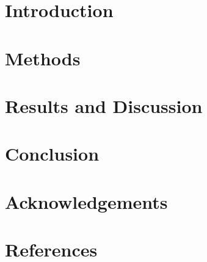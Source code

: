 \documentclass[%
    a4paper,
    conference,
    oneside,
    twocolumn]{IEEEtran}
\title{\docTitle}
\author{%
    \IEEEauthorblockN{\docAuthorN}
    \IEEEauthorblockA{\docAuthorA}}
\begin{document}
\maketitle

\begin{abstract}
\blindtext
\end{abstract}

\section{Introduction}
\blindtext[2]

\section{Methods}
\blindtext[5]

\section{Results and Discussion}
\blindtext[3]

\section{Conclusion}
\blindtext[2]

\section{Acknowledgements}
\blindtext[1]

\section{References}
\blindtext[3]
\end{document}
